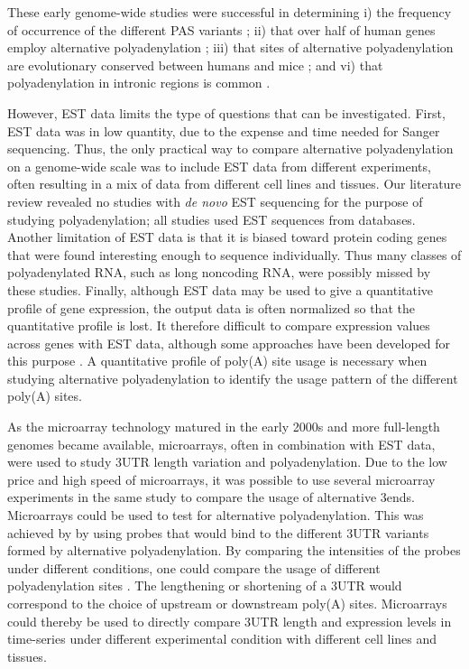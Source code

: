 These early genome-wide studies were successful in determining i) the frequency
of occurrence of the different PAS variants \cite{beaudoing_patterns_2000}; ii)
that over half of human genes employ alternative polyadenylation
\cite{tian_large-scale_2005}; iii) that sites of alternative polyadenylation
are evolutionary conserved between humans and mice
\cite{tian_large-scale_2005}; and vi) that polyadenylation in intronic regions
is common \cite{tian_widespread_2007}.

However, EST data limits the type of questions that can be investigated. First,
EST data was in low quantity, due to the expense and time needed for Sanger
sequencing. Thus, the only practical way to compare alternative polyadenylation
on a genome-wide scale was to include EST data from different experiments,
often resulting in a mix of data from different cell lines and tissues. Our
literature review revealed no studies with \textit{de novo} EST sequencing for
the purpose of studying polyadenylation; all studies used EST sequences from
databases. Another limitation of EST data is that it is biased toward protein
coding genes that were found interesting enough to sequence individually. Thus
many classes of polyadenylated RNA, such as long noncoding RNA, were possibly
missed by these studies. Finally, although EST data may be used to give a
quantitative profile of gene expression, the output data is often normalized so
that the quantitative profile is lost. It therefore difficult to compare
expression values across genes with EST data, although some approaches have
been developed for this purpose \cite{liu_quantitative_2006}. A quantitative
profile of poly(A) site usage is necessary when studying alternative
polyadenylation to identify the usage pattern of the different poly(A) sites.

As the microarray technology matured in the early 2000s and more full-length
genomes became available, microarrays, often in combination with EST data, were
used to study 3\ppp UTR length variation and polyadenylation. Due to the low
price and high speed of microarrays, it was possible to use several microarray
experiments in the same study to compare the usage of alternative 3\ppp ends.
Microarrays could be used to test for alternative polyadenylation. This was
achieved by by using probes that would bind to the different 3\ppp UTR variants
formed by alternative polyadenylation. By comparing the intensities of the
probes under different conditions, one could compare the usage of different
polyadenylation sites \cite{sandberg_proliferating_2008, ji_progressive_2009}.
The lengthening or shortening of a 3\ppp UTR would correspond to the choice of
upstream or downstream poly(A) sites. Microarrays could thereby be used to
directly compare 3\ppp UTR length and expression levels in time-series under
different experimental condition with different cell lines and tissues.

